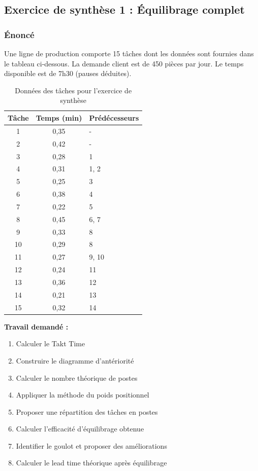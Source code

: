 \documentclass[12pt,a4paper]{article}
\begin{document}
\begin{center}
\subsection{Exercice de synthèse 1 : Équilibrage complet}

\subsubsection{Énoncé}
Une ligne de production comporte 15 tâches dont les données sont fournies dans le tableau ci-dessous. La demande client est de 450 pièces par jour. Le temps disponible est de 7h30 (pauses déduites).

\begin{table}[H]
\centering
\caption{Données des tâches pour l'exercice de synthèse}
\label{tab:synth1_donnees}
\begin{tabular}{|c|c|l|}
\hline
\textbf{Tâche} & \textbf{Temps (min)} & \textbf{Prédécesseurs} \\ \hline
1 & 0,35 & - \\
2 & 0,42 & - \\
3 & 0,28 & 1 \\
4 & 0,31 & 1, 2 \\
5 & 0,25 & 3 \\
6 & 0,38 & 4 \\
7 & 0,22 & 5 \\
8 & 0,45 & 6, 7 \\
9 & 0,33 & 8 \\
10 & 0,29 & 8 \\
11 & 0,27 & 9, 10 \\
12 & 0,24 & 11 \\
13 & 0,36 & 12 \\
14 & 0,21 & 13 \\
15 & 0,32 & 14 \\
\hline
\end{tabular}
\end{table}

\textbf{Travail demandé :}
\begin{enumerate}
    \item Calculer le Takt Time
    \item Construire le diagramme d'antériorité
    \item Calculer le nombre théorique de postes
    \item Appliquer la méthode du poids positionnel
    \item Proposer une répartition des tâches en postes
    \item Calculer l'efficacité d'équilibrage obtenue
    \item Identifier le goulot et proposer des améliorations
    \item Calculer le lead time théorique après équilibrage
\end{enumerate}


\end{center}
\end{document}
